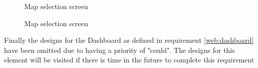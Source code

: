 \begin{figure}[h]
	\centering
	\caption{Map selection screen}
	\label{fig:webappmapsel}
\end{figure}
\begin{figure}[h]
	\centering
	\caption{Map selection screen}
	\label{fig:webappmapeditor}
\end{figure}

Finally the designs for the Dashboard as defined in requirement \ref{web:dashboard} have been omitted due to having a priority of "could". The designs for this element will be visited if there is time in the future to complete this requirement
\pagebreak
